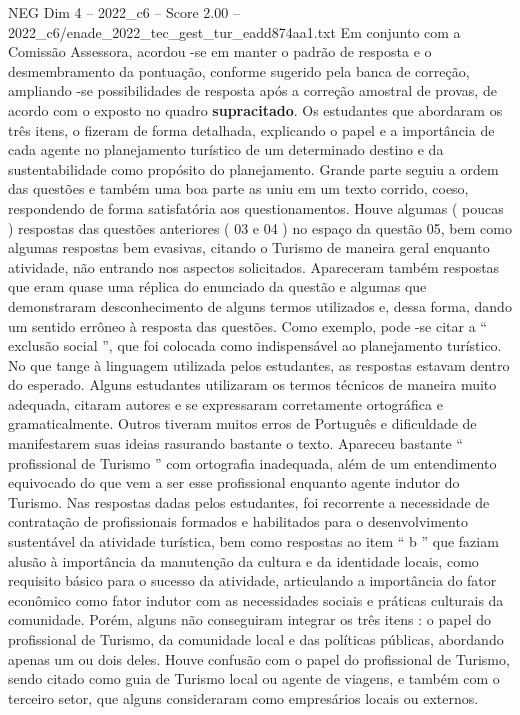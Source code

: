 \begin{textsample}{NEG Dim 4 – 2022\_c6 – Score 2.00 – 2022\_c6/enade\_2022\_tec\_gest\_tur\_eadd874aa1.txt}
Em conjunto com a Comissão Assessora, acordou -se em manter o padrão de resposta e o desmembramento da pontuação, conforme sugerido pela banca de correção, ampliando -se possibilidades de resposta após a correção amostral de provas, de acordo com o exposto no quadro \textbf{supracitado}.
Os estudantes que abordaram os três itens, o fizeram de forma detalhada, explicando o papel e a importância de cada agente no planejamento turístico de um determinado destino e da sustentabilidade como propósito do planejamento.
Grande parte seguiu a ordem das questões e também uma boa parte as uniu em um texto corrido, coeso, respondendo de forma satisfatória aos questionamentos.
Houve algumas ( poucas ) respostas das questões anteriores ( 03 e 04 ) no espaço da questão 05, bem como algumas respostas bem evasivas, citando o Turismo de maneira geral enquanto atividade, não entrando nos aspectos solicitados.
Apareceram também respostas que eram quase uma réplica do enunciado da questão e algumas que demonstraram desconhecimento de alguns termos utilizados e, dessa forma, dando um sentido errôneo à resposta das questões.
Como exemplo, pode -se citar a “ exclusão social ”, que foi colocada como indispensável ao planejamento turístico.
No que tange à linguagem utilizada pelos estudantes, as respostas estavam dentro do esperado.
Alguns estudantes utilizaram os termos técnicos de maneira muito adequada, citaram autores e se expressaram corretamente ortográfica e gramaticalmente.
Outros tiveram muitos erros de Português e dificuldade de manifestarem suas ideias rasurando bastante o texto.
Apareceu bastante “ profissional de Turismo ” com ortografia inadequada, além de um entendimento equivocado do que vem a ser esse profissional enquanto agente indutor do Turismo.
Nas respostas dadas pelos estudantes, foi recorrente a necessidade de contratação de profissionais formados e habilitados para o desenvolvimento sustentável da atividade turística, bem como respostas ao item “ b ” que faziam alusão à importância da manutenção da cultura e da identidade locais, como requisito básico para o sucesso da atividade, articulando a importância do fator econômico como fator indutor com as necessidades sociais e práticas culturais da comunidade.
Porém, alguns não conseguiram integrar os três itens : o papel do profissional de Turismo, da comunidade local e das políticas públicas, abordando apenas um ou dois deles.
Houve confusão com o papel do profissional de Turismo, sendo citado como guia de Turismo local ou agente de viagens, e também com o terceiro setor, que alguns consideraram como empresários locais ou externos.

\end{textsample}
